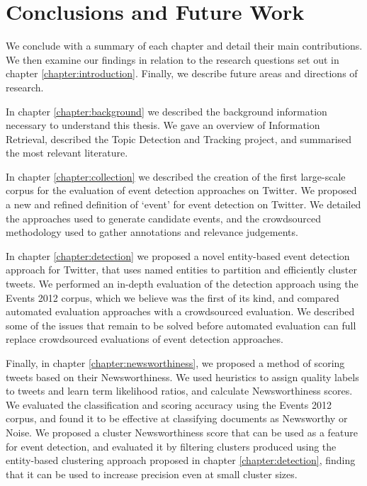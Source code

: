 
\chapter{Conclusions and Future Work}
\label{chapter:Conclusion}
We conclude with a summary of each chapter and detail their main contributions. We then examine our findings in relation to the research questions set out in chapter \ref{chapter:introduction}. Finally, we describe future areas and directions of research.

In chapter \ref{chapter:background} we described the background information necessary to understand this thesis. We gave an overview of Information Retrieval, described the Topic Detection and Tracking project, and summarised the most relevant literature.

In chapter \ref{chapter:collection} we described the creation of the first large-scale corpus for the evaluation of event detection approaches on Twitter.
We  proposed a new and refined definition of `event' for event detection on Twitter.
We detailed the approaches used to generate candidate events, and the crowdsourced methodology used to gather annotations and relevance judgements.

In chapter \ref{chapter:detection} we proposed a novel entity-based event detection approach for Twitter, that uses named entities to partition and efficiently cluster tweets.
We performed an in-depth evaluation of the detection approach using the Events 2012 corpus, which we believe was the first of its kind, and compared automated evaluation approaches with a crowdsourced evaluation. We described some of the issues that remain to be solved before automated evaluation can full replace crowdsourced evaluations of event detection approaches.

Finally, in chapter \ref{chapter:newsworthiness}, we proposed a method of scoring tweets based on their Newsworthiness.
We used heuristics to assign quality labels to tweets and learn term likelihood ratios, and calculate Newsworthiness scores.
We evaluated the classification and scoring accuracy using the Events 2012 corpus, and found it to be effective at classifying documents as Newsworthy or Noise.
We proposed a cluster Newsworthiness score that can be used as a feature for event detection, and evaluated it by filtering clusters produced using the entity-based clustering approach proposed in chapter \ref{chapter:detection}, finding that it can be used to increase precision even at small cluster sizes.

